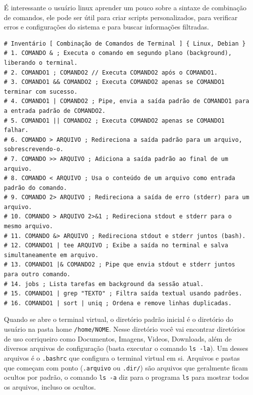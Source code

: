 \documentclass[12pt,a4paper]{article}
\begin{document}
É interessante o usuário linux aprender um pouco sobre a sintaxe de combinação de comandos, ele pode ser útil para criar scripts personalizados, para verificar erros e configurações do sistema e para buscar informações filtradas.\\

\begin{lstlisting}
# Inventário [ Combinação de Comandos de Terminal ] { Linux, Debian }
# 1. COMANDO & ; Executa o comando em segundo plano (background), liberando o terminal.
# 2. COMANDO1 ; COMANDO2 // Executa COMANDO2 após o COMANDO1.
# 3. COMANDO1 && COMANDO2 ; Executa COMANDO2 apenas se COMANDO1 terminar com sucesso.
# 4. COMANDO1 | COMANDO2 ; Pipe, envia a saída padrão de COMANDO1 para a entrada padrão de COMANDO2.
# 5. COMANDO1 || COMANDO2 ; Executa COMANDO2 apenas se COMANDO1 falhar.
# 6. COMANDO > ARQUIVO ; Redireciona a saída padrão para um arquivo, sobrescrevendo-o.
# 7. COMANDO >> ARQUIVO ; Adiciona a saída padrão ao final de um arquivo.
# 8. COMANDO < ARQUIVO ; Usa o conteúdo de um arquivo como entrada padrão do comando.
# 9. COMANDO 2> ARQUIVO ; Redireciona a saída de erro (stderr) para um arquivo.
# 10. COMANDO > ARQUIVO 2>&1 ; Redireciona stdout e stderr para o mesmo arquivo.
# 11. COMANDO &> ARQUIVO ; Redireciona stdout e stderr juntos (bash).
# 12. COMANDO1 | tee ARQUIVO ; Exibe a saída no terminal e salva simultaneamente em arquivo.
# 13. COMANDO1 |& COMANDO2 ; Pipe que envia stdout e stderr juntos para outro comando.
# 14. jobs ; Lista tarefas em background da sessão atual.
# 15. COMANDO1 | grep "TEXTO" ; Filtra saída textual usando padrões.
# 16. COMANDO1 | sort | uniq ; Ordena e remove linhas duplicadas.
\end{lstlisting}    

\vspace{\baselineskip}

Quando se abre o terminal virtual, o diretório padrão inicial é o diretório do usuário na pasta home \texttt{/home/NOME}. Nesse diretório você vai encontrar diretórios de uso corriqueiro como Documentos, Imagens, Videos, Downloads, além de diversos arquivos de configuração (basta executar o comando \texttt{ls -la}). Um desses arquivos é o \texttt{.bashrc} que configura o terminal virtual em si. Arquivos e pastas que começam com ponto (\texttt{.arquivo} ou \texttt{.dir/}) são arquivos que geralmente ficam ocultos por padrão, o comando \texttt{ls -a} diz para o programa \texttt{ls} para mostrar todos os arquivos, incluso os ocultos. \\
\end{document}
